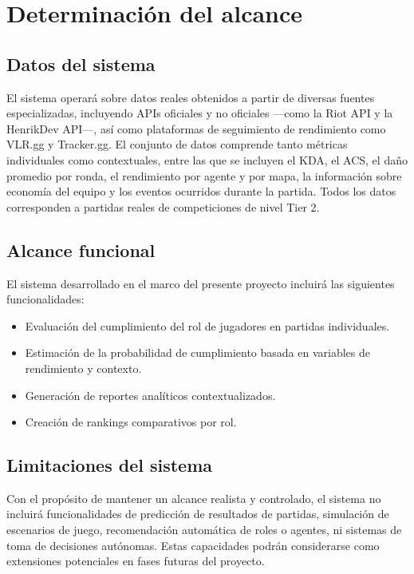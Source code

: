 \documentclass{ULBreport} %
\begin{document}
\section{Determinación del alcance}

\subsection{Datos del sistema}

El sistema operará sobre datos reales obtenidos a partir de diversas fuentes especializadas, incluyendo APIs oficiales y no oficiales ---como la Riot API y la HenrikDev API---, así como plataformas de seguimiento de rendimiento como VLR.gg y Tracker.gg. El conjunto de datos comprende tanto métricas individuales como contextuales, entre las que se incluyen el KDA, el ACS, el daño promedio por ronda, el rendimiento por agente y por mapa, la información sobre economía del equipo y los eventos ocurridos durante la partida. Todos los datos corresponden a partidas reales de competiciones de nivel Tier 2.

\subsection{Alcance funcional}

El sistema desarrollado en el marco del presente proyecto incluirá las siguientes funcionalidades:

\begin{itemize}
    \item Evaluación del cumplimiento del rol de jugadores en partidas individuales.
    \item Estimación de la probabilidad de cumplimiento basada en variables de rendimiento y contexto.
    \item Generación de reportes analíticos contextualizados.
    \item Creación de rankings comparativos por rol.
\end{itemize}

\subsection{Limitaciones del sistema}

Con el propósito de mantener un alcance realista y controlado, el sistema no incluirá funcionalidades de predicción de resultados de partidas, simulación de escenarios de juego, recomendación automática de roles o agentes, ni sistemas de toma de decisiones autónomas. Estas capacidades podrán considerarse como extensiones potenciales en fases futuras del proyecto.
\end{document}
